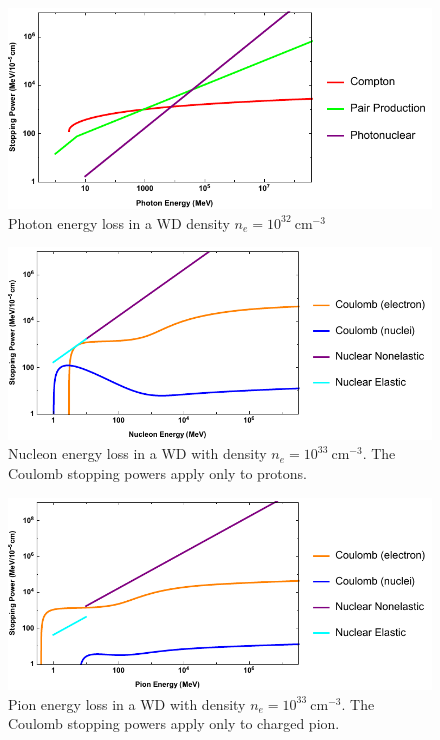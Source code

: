 \documentclass[twocolumn,showpacs,preprintnumbers,amsmath,amssymb,prd]{revtex4}
\begin{document}
\begin{appendices}
\begin{figure}
\includegraphics[scale=.60]{SPphoton.pdf}
\caption{Photon energy loss in a WD density $n_e = 10^{32} ~\text{cm}^{-3}$}
\label{fig:SPphoton}
\end{figure}

\begin{figure}
\includegraphics[scale=.60]{SPnucleon.pdf}
\caption{Nucleon energy loss in a WD with density $n_e = 10^{33} ~\text{cm}^{-3}$. The Coulomb stopping powers apply only to protons.}
\label{fig:SPnuc}
\end{figure}

\begin{figure}
\includegraphics[scale=.60]{SPpion.pdf}
\caption{Pion energy loss in a WD with density $n_e = 10^{33} ~\text{cm}^{-3}$. The Coulomb stopping powers apply only to charged pion.}
\label{fig:SPpion}
\end{figure}


\end{appendices}
\end{document}
